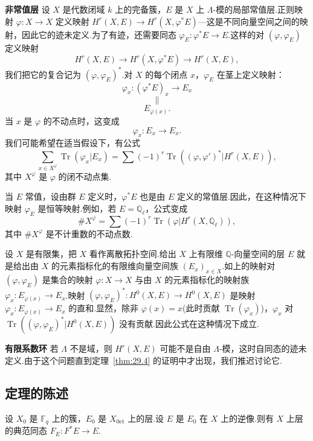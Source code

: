 \textbf{非常值层} 设 $X$ 是代数闭域 $k$ 上的完备簇，$E$ 是 $X$ 上 $\Lambda$-模的局部常值层.正则映射 $\varphi \colon X \to X$ 定义映射 $H^{r}(X, E) \to H^{r}(X, \varphi^{*}E)$---这是不同向量空间之间的映射，因此它的迹未定义.为了有迹，还需要同态 $\varphi_E \colon \varphi^{*}E \to E$.这样的对 $(\varphi, \varphi_E)$ 定义映射
\[
H^{r}(X, E) \to H^{r}(X, \varphi^{*}E) \to H^{r}(X, E),
\]
我们把它的复合记为 $(\varphi, \varphi_E)^{*}$.对 $X$ 的每个闭点 $x$，$\varphi_E$ 在茎上定义映射：
\[
\varphi_x \colon (\varphi^{*}E)_x \to E_x
\]
\[
\parallel
\]
\[
E_{\varphi(x)}.
\]
当 $x$ 是 $\varphi$ 的不动点时，这变成
\[
\varphi_x \colon E_x \to E_x.
\]
我们可能希望在适当假设下，有公式
\[
\sum_{x \in X^{\varphi}} \operatorname{Tr}(\varphi_x|E_x) = \sum (-1)^{r} \operatorname{Tr}((\varphi, \varphi')^{*}|H^{r}(X, E)),
\]
其中 $X^{\varphi}$ 是 $\varphi$ 的闭不动点集.

当 $E$ 常值，设由群 $E$ 定义时，$\varphi^{*}E$ 也是由 $E$ 定义的常值层.因此，在这种情况下映射 $\varphi_E$ 是恒等映射.例如，若 $E = \mathbb{Q}_{\ell}$，公式变成
\[
\#X^{\varphi} = \sum (-1)^{r} \operatorname{Tr}(\varphi|H^{r}(X, \mathbb{Q}_{\ell})),
\]
其中 $\#X^{\varphi}$ 是不计重数的不动点数.

\begin{remark}\label{rem:29.2}
设 $X$ 是有限集，把 $X$ 看作离散拓扑空间.给出 $X$ 上有限维 $\mathbb{Q}$-向量空间的层 $E$ 就是给出由 $X$ 的元素指标化的有限维向量空间族 $(E_x)_{x \in X}$.如上的映射对 $(\varphi, \varphi_E)$ 是集合的映射 $\varphi \colon X \to X$ 与由 $X$ 的元素指标化的映射族 $\varphi_x \colon E_{\varphi(x)} \to E_x$.映射 $(\varphi, \varphi_E)^{*} \colon H^{0}(X, E) \to H^{0}(X, E)$ 是映射 $\varphi_x \colon E_{\varphi(x)} \to E_x$ 的直和.显然，除非 $\varphi(x) = x$(此时贡献 $\operatorname{Tr}(\varphi_x)$)，$\varphi_x$ 对 $\operatorname{Tr}((\varphi, \varphi_E)^{*}|H^{0}(X, E))$ 没有贡献.因此公式在这种情况下成立.
\end{remark}

\textbf{有限系数环} 若 $\Lambda$ 不是域，则 $H^{r}(X, E)$ 可能不是自由 $\Lambda$-模，这时自同态的迹未定义.由于这个问题直到定理~\ref{thm:29.4} 的证明中才出现，我们推迟讨论它.

\subsection*{定理的陈述}

\begin{lemma}\label{lem:29.3}
设 $X_0$ 是 $\mathbb{F}_q$ 上的簇，$E_0$ 是 $X_{0\mathrm{et}}$ 上的层.设 $E$ 是 $E_0$ 在 $X$ 上的逆像.则有 $X$ 上层 的典范同态 $F_E \colon F^{*}E \to E$.
\end{lemma}

